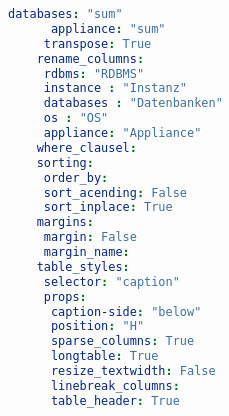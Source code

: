 \begin{lstlisting}[language=yaml, caption=Python LaTex - pandas\_data\_chart\_plotter\_conf.yaml - Konfigurationsdatei - CSV - Diagramme,captionpos=b,label={lst:pandas_data_chart_plotter_conf},breaklines=true]
      databases: "sum"
      appliance: "sum"
     transpose: True
    rename_columns:
     rdbms: "RDBMS"
     instance : "Instanz"
     databases : "Datenbanken"
     os : "OS"
     appliance: "Appliance"
    where_clausel:
    sorting:
     order_by:
     sort_acending: False
     sort_inplace: True
    margins:
     margin: False
     margin_name:
    table_styles:
     selector: "caption"
     props:
      caption-side: "below"
      position: "H"
      sparse_columns: True
      longtable: True
      resize_textwidth: False
      linebreak_columns:
      table_header: True
\end{lstlisting}